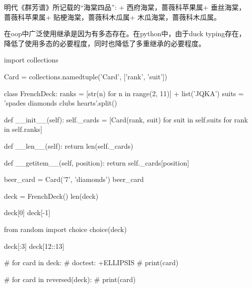明代《群芳谱》所记载的“海棠四品”: + 西府海棠，蔷薇科苹果属+ 垂丝海棠，
蔷薇科苹果属+ 贴梗海棠，蔷薇科木瓜属+ 木瓜海棠，蔷薇科木瓜属。

在oop中广泛使用继承是因为有多态存在。在python中，由于duck typing存在，
降低了使用多态的必要程度，同时也降低了多重继承的必要程度。

\begin{python}
import collections

Card = collections.namedtuple('Card', ['rank', 'suit'])

class FrenchDeck:
    ranks = [str(n) for n in range(2, 11)] + list('JQKA')
    suits = 'spades diamonds clubs hearts'.split()

    def __init__(self):
        self._cards = [Card(rank, suit) for suit in self.suits
                                        for rank in self.ranks]

    def __len__(self):
        return len(self._cards)

    def __getitem__(self, position):
        return self._cards[position]

beer_card = Card('7', 'diamonds')
beer_card

deck = FrenchDeck()
len(deck)

deck[0]
deck[-1]

from random import choice 
choice(deck)

deck[:3]
deck[12::13]

# for card in deck:  #  doctest: +ELLIPSIS
#     print(card)

# for card in reversed(deck):
#     print(card)
\end{python}






